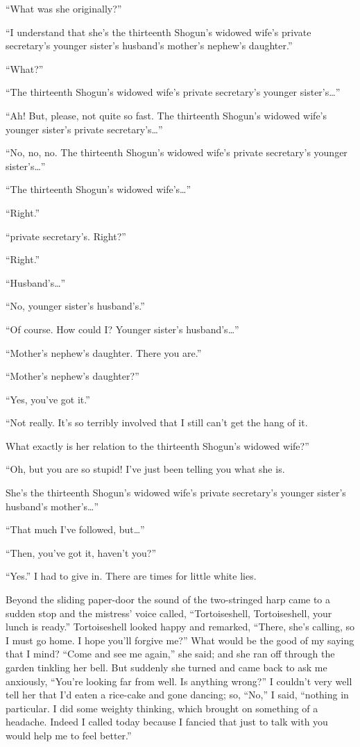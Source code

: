 \documentclass[12pt, openright]{book}
\begin{document}
``What was she originally?''

``I understand that she's the thirteenth Shogun's widowed wife's
private secretary's younger sister's husband's mother's nephew's
daughter.''

``What?''

``The thirteenth Shogun's widowed wife's private secretary's younger
sister's\ldots{}''

``Ah! But, please, not quite so fast. The thirteenth Shogun's widowed
wife's younger sister's private secretary's\ldots{}''

``No, no, no. The thirteenth Shogun's widowed wife's private secretary's
younger sister's\ldots{}''

``The thirteenth Shogun's widowed wife's\ldots{}''

``Right.''

``private secretary's. Right?''

``Right.''

``Husband's\ldots{}''

``No, younger sister's husband's.''

``Of course. How could I? Younger sister's husband's\ldots{}''

``Mother's nephew's daughter. There you are.''

``Mother's nephew's daughter?''

``Yes, you've got it.''

``Not really. It's so terribly involved that I still can't get the hang
of it.

What exactly is her relation to the thirteenth Shogun's widowed wife?''

``Oh, but you are so stupid! I've just been telling you what she is.

She's the thirteenth Shogun's widowed wife's private secretary's younger
sister's husband's mother's\ldots{}''

``That much I've followed, but\ldots{}''

``Then, you've got it, haven't you?''

``Yes.'' I had to give in. There are times for little white lies.

Beyond the sliding paper-door the sound of the two-stringed harp came to
a sudden stop and the mistress' voice called, ``Tortoiseshell,
Tortoiseshell, your lunch is ready.'' Tortoiseshell looked happy and
remarked, ``There, she's calling, so I must go home. I hope you'll
forgive me?'' What would be the good of my saying that I mind? ``Come
and see me again,'' she said; and she ran off through the garden
tinkling her bell. But suddenly she turned and came back to ask me
anxiously, ``You're looking far from well. Is anything wrong?'' I
couldn't very well tell her that I'd eaten a rice-cake and gone dancing;
so, ``No,'' I said, ``nothing in particular. I did some weighty
thinking, which brought on something of a headache. Indeed I called
today because I fancied that just to talk with you would help me to feel
better.''
\end{document}
